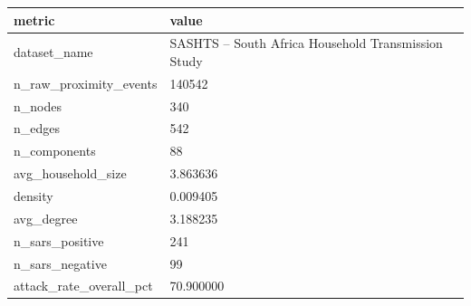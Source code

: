 \begin{tabular}{ll}
\toprule
metric & value \\
\midrule
dataset\_name & SASHTS – South Africa Household Transmission Study \\
n\_raw\_proximity\_events & 140542 \\
n\_nodes & 340 \\
n\_edges & 542 \\
n\_components & 88 \\
avg\_household\_size & 3.863636 \\
density & 0.009405 \\
avg\_degree & 3.188235 \\
n\_sars\_positive & 241 \\
n\_sars\_negative & 99 \\
attack\_rate\_overall\_pct & 70.900000 \\
\bottomrule
\end{tabular}
